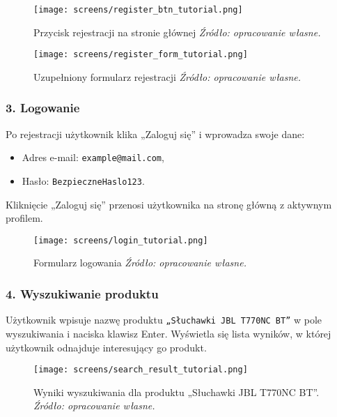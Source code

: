 \documentclass[12pt,a4paper,oneside]{article}
\theoremstyle{definition}
\numberwithin{equation}{section}
\begin{document}
\begin{figure}[H]
    \centering
    \texttt{[image: screens/register\_btn\_tutorial.png]}
    \caption{Przycisk rejestracji na stronie głównej \emph{Źródło: opracowanie własne.}}
    \label{fig:register_btn_tutorial}
\end{figure}

\begin{figure}[H]
    \centering
    \texttt{[image: screens/register\_form\_tutorial.png]}
    \caption{Uzupełniony formularz rejestracji \emph{Źródło: opracowanie własne.}}
    \label{fig:register_form_tutorial}
\end{figure}

\subsubsection*{\textbf{3. Logowanie}}
Po rejestracji użytkownik klika „Zaloguj się” i wprowadza swoje dane:
\begin{itemize}
    \item Adres e-mail: \texttt{example@mail.com},
    \item Hasło: \texttt{BezpieczneHaslo123}.
\end{itemize}
Kliknięcie „Zaloguj się” przenosi użytkownika na stronę główną z aktywnym profilem.

\begin{figure}[H]
    \centering
    \texttt{[image: screens/login\_tutorial.png]}
    \caption{Formularz logowania \emph{Źródło: opracowanie własne.}}
    \label{fig:login_tutorial}
\end{figure}

\subsubsection*{\textbf{4. Wyszukiwanie produktu}}
Użytkownik wpisuje nazwę produktu \texttt{„Słuchawki JBL T770NC BT”} w pole wyszukiwania i naciska klawisz Enter. Wyświetla się lista wyników, w której użytkownik odnajduje interesujący go produkt.

\begin{figure}[H]
    \centering
    \texttt{[image: screens/search\_result\_tutorial.png]}
    \caption{Wyniki wyszukiwania dla produktu „Słuchawki JBL T770NC BT”. \emph{Źródło: opracowanie własne.}}
    \label{fig:search_results_tutorial}
\end{figure}
\end{document}
